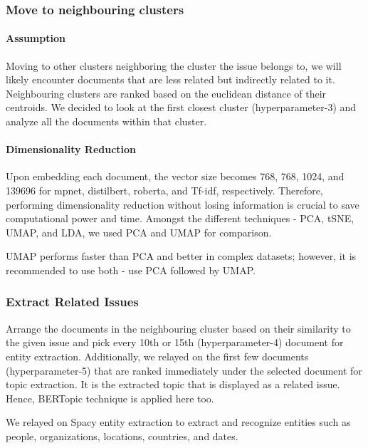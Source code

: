\documentclass[sigconf,authorversion,nonacm]{acmart}
\begin{document}
\subsubsection{Move to neighbouring clusters}
\paragraph{Assumption}
Moving to other clusters neighboring the cluster the issue belongs to, we will likely encounter documents that are less related but indirectly related to it. Neighbouring clusters are ranked based on the euclidean distance of their centroids. We decided to look at the first closest cluster (hyperparameter-3) and analyze all the documents within that cluster.

\paragraph{Dimensionality Reduction}
Upon embedding each document, the vector size becomes 768, 768, 1024, and 139696 for mpnet, distilbert, roberta, and Tf-idf, respectively. Therefore, performing dimensionality reduction without losing information is crucial to save computational power and time. Amongst the different techniques - PCA, tSNE, UMAP, and LDA, we used PCA and UMAP for comparison.

UMAP performs faster than PCA and better in complex datasets; however, it is recommended to use both - use PCA followed by UMAP.

\subsubsection{Extract Related Issues}

Arrange the documents in the neighbouring cluster based on their similarity to the given issue and pick every 10th or 15th (hyperparameter-4) document for entity extraction.  Additionally, we relayed on the first few documents (hyperparameter-5) that are ranked immediately under the selected document for topic extraction. It is the extracted topic that is displayed as a related issue. Hence, BERTopic technique is applied here too.

We relayed on Spacy entity extraction to extract and recognize entities such as people, organizations, locations, countries, and dates.
\end{document}

